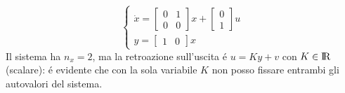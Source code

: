 \documentclass[../main.tex]{subfiles}
\begin{document}
		\begin{mdframed}[style=Exercise]
			\begin{Exercise}[title={Retroazione algebrica sull'uscita}, difficulty=1]
				\[
					\begin{cases}
						\dot x=
						\begin{bmatrix}
							0 & 1\\
							0 & 0
						\end{bmatrix} x+
						\begin{bmatrix}
							0\\
							1
						\end{bmatrix} u
						\\[.5cm]
						y =
						\begin{bmatrix}
							1 & 0
						\end{bmatrix} x
					\end{cases}
				\]
				Il sistema ha $ n_x = 2 $, ma la retroazione sull'uscita \'e $ u = Ky + v $ con $ K \in \rm I\!R $ (scalare): \'e evidente che con la sola variabile $ K $ non posso fissare entrambi gli autovalori del sistema.
				

\end{Exercise}
\end{mdframed}
\end{document}
